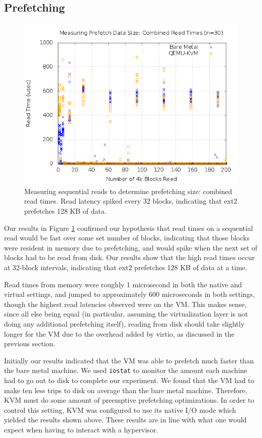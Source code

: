 \documentclass[letterpaper,twocolumn,10pt]{article}
\begin{document}
\subsection{Prefetching}
\begin{figure}[!ht]
\includegraphics[scale=.35]{combined_graphs/prefetch_combined.png}
\caption{Measuring sequential reads to determine prefetching size: combined read times. Read latency spiked every 32 blocks, indicating that ext2 prefetches 128 KB of data.}
\label{fig:prefetch_combined}
\end{figure}
Our results in Figure \ref{fig:prefetch_combined} confirmed our hypothesis that read times on a sequential read would be fast over some set number of blocks, indicating that those blocks were resident in memory due to prefetching, and would spike when the next set of blocks had to be read from disk. 
Our results show that the high read times occur at 32-block intervals, indicating that ext2 prefetches 128 KB of data at a time. 

Read times from memory were roughly 1 microsecond in both the native and virtual settings, and jumped to approximately 600 microseconds in both settings, though the highest read latencies observed were on the VM. 
This makes sense, since all else being equal (in particular, assuming the virtualization layer is not doing any additional prefetching itself), reading from disk should take slightly longer for the VM due to the overhead added by virtio, as discussed in the previous section.

Initially our results indicated that the VM was able to prefetch much faster than the bare metal machine. 
We used \texttt{iostat} to monitor the amount each machine had to go out to disk to complete our experiment. 
We found that the VM had to make ten less trips to disk on average than the bare metal machine.
Therefore, KVM must do some amount of preemptive prefetching optimizations.
In order to control this setting, KVM was configured to use its native I/O mode which yielded the results shown above.
These results are in line with what one would expect when having to interact with a hypervisor.
\end{document}

